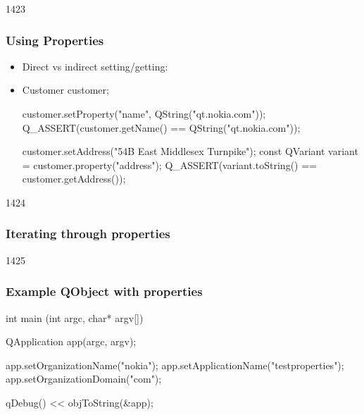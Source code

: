 \begin{slide}[fragile]{1423}
\frametitle{Using Properties}
\begin{itemize}
\item Direct vs indirect setting/getting:
\item[]
\begin{cpp}
Customer customer;

customer.setProperty("name", QString("qt.nokia.com"));
Q_ASSERT(customer.getName() == QString("qt.nokia.com"));

customer.setAddress("54B East Middlesex Turnpike");
const QVariant variant = customer.property("address");
Q_ASSERT(variant.toString() == customer.getAddress());
\end{cpp}
\end{itemize}
\end{slide}

\begin{slide}[fragile]{1424}
\frametitle{Iterating through properties}
\end{slide}

\begin{slide}[fragile]{1425}
\frametitle{Example QObject with properties}
\begin{cpp}
int main (int argc, char* argv[])
{
  QApplication app(argc, argv);

  app.setOrganizationName("nokia");
  app.setApplicationName("testproperties");
  app.setOrganizationDomain("com");

  qDebug() << objToString(&app);
}
\end{cpp}
\end{slide}


